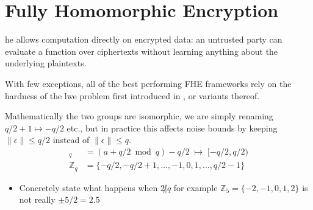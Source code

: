 \renewcommand{\vec}[1]{\overrightarrow{\mathbf{#1}}}

\section{Fully Homomorphic Encryption}
\gls{he} allows computation directly on encrypted data: an untrusted party can evaluate a function over ciphertexts without learning anything about the underlying plaintexts. %

With few exceptions, all of the best performing FHE frameworks \cite{cryptoeprint:2011/277, BFV, CKKS, TFHE} rely on the hardness of the \gls{lwe} problem first introduced in \cite{regev:2009}, or variants thereof. 



\begin{definition}
    Mathematically the two groups are isomorphic, we are simply renaming $q/2 +1 \mapsto -q/2$ etc., but in practice this affects noise bounds by keeping $\|\epsilon\| \leq q/2$ instead of $\|\epsilon\| \leq q$.
    \begin{align}
        [a]_q &= (a + q/2 \bmod{q}) - q/2 \;\longmapsto\; [-q/2, q/2) \\
        \mathbb{Z}_q &= \{-q/2, -q/2 + 1, \dots, -1, 0, 1, \dots, q/2 - 1\}
    \end{align}
\end{definition}

\begin{itemize}
    \item Concretely state what happens when $2 \not| q$ for example $\mathbb{Z}_5 = \{-2, -1, 0, 1, 2\}$ is not really $\pm5/2 = 2.5$
\end{itemize}

